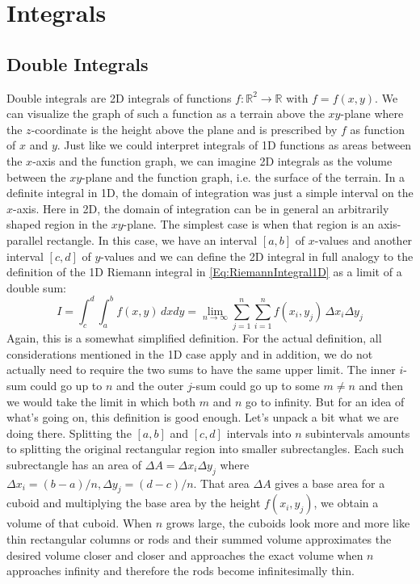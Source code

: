 \section{Integrals}

\subsection{Double Integrals}
Double integrals are 2D integrals of functions $f: \mathbb{R}^2 \rightarrow \mathbb{R}$ with $f = f(x,y)$. We can visualize the graph of such a function as a terrain above the $xy$-plane where the $z$-coordinate is the height above the plane and is prescribed by $f$ as function of $x$ and $y$. Just like we could interpret integrals of 1D functions as areas between the $x$-axis and the function graph, we can imagine 2D integrals as the volume between the $xy$-plane and the function graph, i.e. the surface of the terrain. In a definite integral in 1D, the domain of integration was just a simple interval on the $x$-axis. Here in 2D, the domain of integration can be in general an arbitrarily shaped region in the $xy$-plane. The simplest case is when that region is an axis-parallel rectangle. In this case, we have an interval $[a,b]$ of $x$-values and another interval $[c,d]$ of $y$-values and we can define the 2D integral in full analogy to the definition of the 1D Riemann integral in \ref{Eq:RiemannIntegral1D} as a limit of a double sum:
\begin{equation}
 I =  \int_c^d \int_a^b f(x,y) \, dx dy = \lim_{n \rightarrow \infty} \sum_{j=1}^n \sum_{i=1}^n f(x_i, y_j) \, \Delta x_i \Delta y_j
\end{equation}
Again, this is a somewhat simplified definition. For the actual definition, all considerations mentioned in the 1D case apply and in addition, we do not actually need to require the two sums to have the same upper limit. The inner $i$-sum could go up to $n$ and the outer $j$-sum could go up to some $m \neq n$ and then we would take the limit in which both $m$ and $n$ go to infinity. But for an idea of what's going on, this definition is good enough. Let's unpack a bit what we are doing there. Splitting the $[a,b]$ and $[c,d]$ intervals into $n$ subintervals amounts to splitting the original rectangular region into smaller subrectangles. Each such subrectangle has an area of $\Delta A = \Delta x_i \Delta y_j$ where $\Delta x_i = (b-a)/n, \Delta y_j = (d-c)/n$. That area $\Delta A$ gives a base area for a cuboid and multiplying the base area by the height $f(x_i, y_j)$, we obtain a volume of that cuboid. When $n$ grows large, the cuboids look more and more like thin rectangular columns or rods and their summed volume approximates the desired volume closer and closer and approaches the exact volume when $n$ approaches infinity and therefore the rods become infinitesimally thin.


